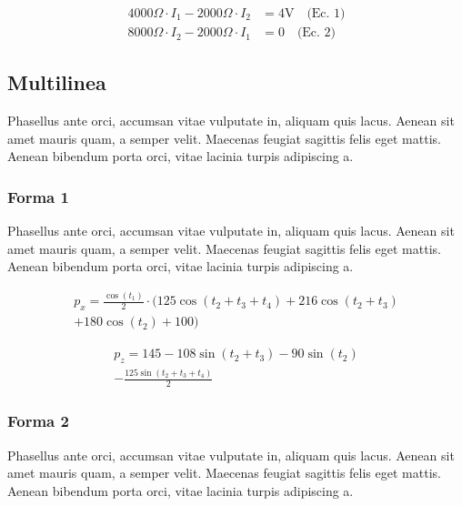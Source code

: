 \documentclass[colTwo]{NanouparIEEE}
\begin{document}
            \begin{align*}
                4000 \Omega \cdot I_1 - 2000 \Omega \cdot I_2 &= 4 \text{V} \quad \text{(Ec. 1)} \\
                8000 \Omega \cdot I_2 - 2000 \Omega \cdot I_1 &= 0 \quad \text{(Ec. 2)}
            \end{align*}

        \subsection{Multilinea}
            Phasellus ante orci, accumsan vitae vulputate in, aliquam quis lacus. Aenean sit amet mauris quam, a semper velit. Maecenas feugiat sagittis felis eget mattis. Aenean bibendum porta orci, vitae lacinia turpis adipiscing a. 
            
            \subsubsection{Forma 1}
                Phasellus ante orci, accumsan vitae vulputate in, aliquam quis lacus. Aenean sit amet mauris quam, a semper velit. Maecenas feugiat sagittis felis eget mattis. Aenean bibendum porta orci, vitae lacinia turpis adipiscing a. 
                
                \begin{multline*}
                    p_x = \frac{\cos{(t_1)}}{2} \cdot ( 125\cos{(t_2 + t_3 + t_4)} + 216\cos{(t_2 + t_3)} \\ + 180\cos{(t_2)} + 100)
                \end{multline*}
    
                \begin{multline*}
                    p_z = 145 - 108\sin{(t_2 + t_3)} - 90\sin{(t_2)} \\ - \frac{125\sin{(t_2 + t_3 + t_4)}}{2}
                \end{multline*}

            \subsubsection{Forma 2}
                Phasellus ante orci, accumsan vitae vulputate in, aliquam quis lacus. Aenean sit amet mauris quam, a semper velit. Maecenas feugiat sagittis felis eget mattis. Aenean bibendum porta orci, vitae lacinia turpis adipiscing a. 
                
\end{document}
